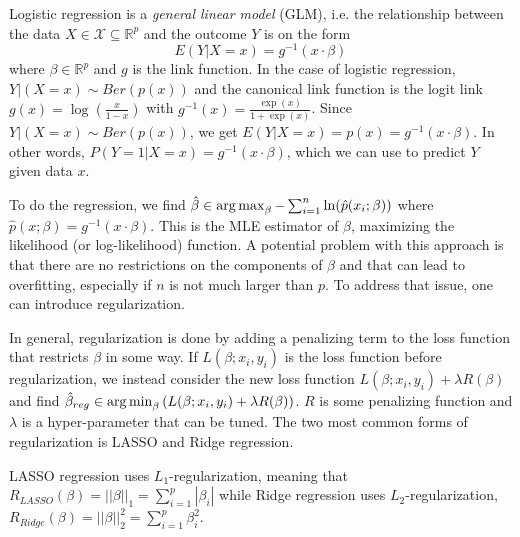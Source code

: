 \documentclass[../../project.tex]{subfiles}
\begin{document}
	Logistic regression is a \textit{general linear model} (GLM), i.e. the relationship between the data $X \in \mathcal{X} \subseteq \mathbb{R}^p$ and the outcome $Y$ is on the form
	\begin{equation}
	E(Y|X=x) = g^{-1}(x \cdot \beta)
	\end{equation}
	where $\beta \in \mathbb{R}^p$ and $g$ is the link function. In the case of logistic regression, $Y|(X = x) \sim Ber(p(x))$ and the canonical link function is the logit link $g(x) = \log \left( \frac{x}{1 - x} \right)$ with $g^{-1}(x) = \frac{\exp(x)}{1 + \exp(x)}$. Since $Y|(X=x) \sim Ber(p(x))$, we get $E(Y|X=x) = p(x) = g^{-1}(x \cdot \beta)$. In other words, $P(Y = 1 | X = x) = g^{-1}(x \cdot \beta)$, which we can use to predict $Y$ given data $x$.
	
	To do the regression, we find $\hat \beta \in \operatorname*{arg\,max}_\beta - \sum_{i=1}^{n} \ln (\hat p(x_i; \beta))$ where $\hat p(x;\beta) = g^{-1} (x \cdot \beta)$. This is the MLE estimator of $\beta$, maximizing the likelihood (or log-likelihood) function. A potential problem with this approach is that there are no restrictions on the components of $\beta$ and that can lead to overfitting, especially if $n$ is not much larger than $p$. To address that issue, one can introduce regularization.
	
	In general, regularization is done by adding a penalizing term to the loss function that restricts $\beta$ in some way. If $L(\beta; x_i,y_i)$ is the loss function before regularization, we instead consider the new loss function $L(\beta; x_i,y_i) + \lambda R(\beta)$ and find $\hat \beta_{reg} \in \operatorname*{arg\,min}_\beta \left( L(\beta; x_i, y_i) + \lambda R(\beta) \right)$. $R$ is some penalizing function and $\lambda$ is a hyper-parameter that can be tuned. The two most common forms of regularization is LASSO and Ridge regression.
	
	LASSO regression uses $L_1$-regularization, meaning that $R_{LASSO}(\beta) = ||\beta||_1 =  \sum_{i=1}^{p} |\beta_i|$ while Ridge regression uses $L_2$-regularization, $R_{Ridge}(\beta) = ||\beta||_2^2 = \sum_{i=1}^{p} \beta_i^2$.
	
\end{document}
